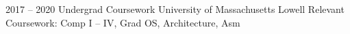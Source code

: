 \documentclass[9pt]{developercv} %
\begin{document}


\begin{entrylist}
	\entry
	{2017 -- 2020}
	{Undergrad Coursework}
	{University of Massachusetts Lowell}
	{
            Relevant Coursework: Comp I -- IV, Grad OS, Architecture, Asm
        }
\end{entrylist}
\end{document}

